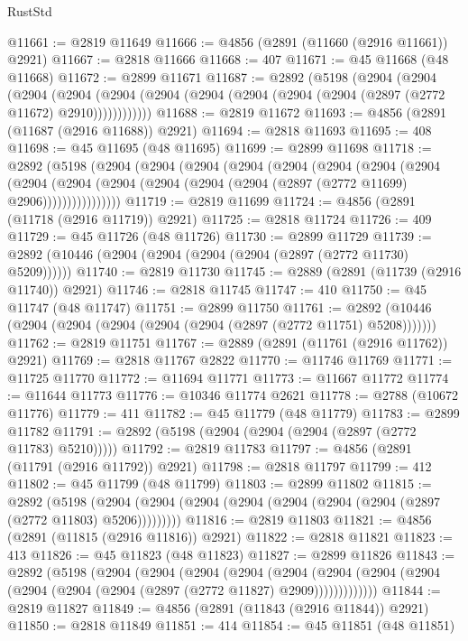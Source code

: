 \begin{lexlean}{RustStd}
\begin{coremodule}
@11661 := @2819 @11649
@11666 := @4856 (@2891 (@11660 (@2916 @11661)) @2921)
@11667 := @2818 @11666
@11668 := 407
@11671 := @45 @11668 (@48 @11668)
@11672 := @2899 @11671
@11687 := @2892
    (@5198
      (@2904
        (@2904
          (@2904
            (@2904 (@2904 (@2904 (@2904 (@2904 (@2904 (@2904 (@2897 (@2772 @11672) @2910))))))))))))
@11688 := @2819 @11672
@11693 := @4856 (@2891 (@11687 (@2916 @11688)) @2921)
@11694 := @2818 @11693
@11695 := 408
@11698 := @45 @11695 (@48 @11695)
@11699 := @2899 @11698
@11718 := @2892
    (@5198
      (@2904
        (@2904
          (@2904
            (@2904
              (@2904
                (@2904
                  (@2904
                    (@2904
                      (@2904
                        (@2904
                          (@2904 (@2904 (@2904 (@2904 (@2897 (@2772 @11699) @2906))))))))))))))))
@11719 := @2819 @11699
@11724 := @4856 (@2891 (@11718 (@2916 @11719)) @2921)
@11725 := @2818 @11724
@11726 := 409
@11729 := @45 @11726 (@48 @11726)
@11730 := @2899 @11729
@11739 := @2892 (@10446 (@2904 (@2904 (@2904 (@2904 (@2897 (@2772 @11730) @5209))))))
@11740 := @2819 @11730
@11745 := @2889 (@2891 (@11739 (@2916 @11740)) @2921)
@11746 := @2818 @11745
@11747 := 410
@11750 := @45 @11747 (@48 @11747)
@11751 := @2899 @11750
@11761 := @2892 (@10446 (@2904 (@2904 (@2904 (@2904 (@2904 (@2897 (@2772 @11751) @5208)))))))
@11762 := @2819 @11751
@11767 := @2889 (@2891 (@11761 (@2916 @11762)) @2921)
@11769 := @2818 @11767 @2822
@11770 := @11746 @11769
@11771 := @11725 @11770
@11772 := @11694 @11771
@11773 := @11667 @11772
@11774 := @11644 @11773
@11776 := @10346 @11774 @2621
@11778 := @2788 (@10672 @11776)
@11779 := 411
@11782 := @45 @11779 (@48 @11779)
@11783 := @2899 @11782
@11791 := @2892 (@5198 (@2904 (@2904 (@2904 (@2897 (@2772 @11783) @5210)))))
@11792 := @2819 @11783
@11797 := @4856 (@2891 (@11791 (@2916 @11792)) @2921)
@11798 := @2818 @11797
@11799 := 412
@11802 := @45 @11799 (@48 @11799)
@11803 := @2899 @11802
@11815 := @2892
    (@5198 (@2904 (@2904 (@2904 (@2904 (@2904 (@2904 (@2904 (@2897 (@2772 @11803) @5206)))))))))
@11816 := @2819 @11803
@11821 := @4856 (@2891 (@11815 (@2916 @11816)) @2921)
@11822 := @2818 @11821
@11823 := 413
@11826 := @45 @11823 (@48 @11823)
@11827 := @2899 @11826
@11843 := @2892
    (@5198
      (@2904
        (@2904
          (@2904
            (@2904
              (@2904
                (@2904 (@2904 (@2904 (@2904 (@2904 (@2904 (@2897 (@2772 @11827) @2909)))))))))))))
@11844 := @2819 @11827
@11849 := @4856 (@2891 (@11843 (@2916 @11844)) @2921)
@11850 := @2818 @11849
@11851 := 414
@11854 := @45 @11851 (@48 @11851)

\end{coremodule}
\end{lexlean}
